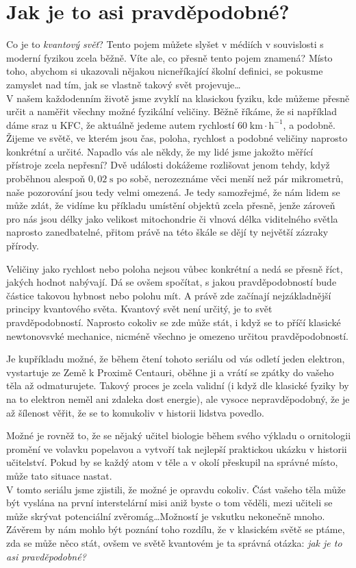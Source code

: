 \documentclass[crop=false]{standalone}
\begin{document}
\section*{Jak je to asi pravděpodobné?}
\quad

Co je to \textit{kvantový svět}? Tento pojem můžete slyšet v médiích v souvislosti s moderní fyzikou zcela běžně. Víte ale, co přesně tento pojem znamená? Místo toho, abychom si ukazovali nějakou nicneříkající školní definici, se pokusme zamyslet nad tím, jak se vlastně takový svět projevuje\dots
\\

V našem každodenním životě jsme zvyklí na klasickou fyziku, kde můžeme přesně určit a naměřit všechny možné fyzikální veličiny. Běžně říkáme, že si například dáme sraz u KFC, že aktuálně jedeme autem rychlostí $60\;\mathrm{km\cdot h^{-1}}$, a podobně. Žijeme ve světě, ve kterém jsou čas, poloha, rychlost a podobné veličiny naprosto konkrétní a určité. Napadlo vás ale někdy, že my lidé jsme jakožto měřící přístroje zcela nepřesní? Dvě události dokážeme rozlišovat jenom tehdy, když proběhnou alespoň $0,02\;\mathrm{s}$ po sobě, nerozeznáme věci menší než pár mikrometrů, naše pozorování jsou tedy velmi omezená. Je tedy samozřejmé, že nám lidem se může zdát, že vidíme ku příkladu umístění objektů zcela přesně, jenže zároveň pro nás jsou délky jako velikost mitochondrie či vlnová délka viditelného světla
naprosto zanedbatelné, přitom právě na této škále se dějí ty největší zázraky přírody. 

Veličiny jako rychlost nebo poloha nejsou vůbec konkrétní a nedá se přesně říct, jakých hodnot nabývají. Dá se ovšem spočítat, s jakou pravděpodobností bude částice takovou hybnost nebo polohu mít. A právě zde začínají nejzákladnější principy kvantového světa. Kvantový svět není určitý, je to svět pravděpodobností. Naprosto cokoliv se zde může stát, i když se to příčí klasické newtonovsvké mechanice, nicméně všechno je omezeno určitou pravděpodobností.

Je kupříkladu možné, že během čtení tohoto seriálu od vás odletí jeden elektron, vystartuje ze Země k Proximě Centauri, oběhne ji a vrátí se zpátky do vašeho těla až odmaturujete. Takový proces je zcela validní (i když dle klasické fyziky by na to elektron neměl ani zdaleka dost energie), ale vysoce nepravděpodobný, že je až šílenost věřit, že se to komukoliv v historii lidstva povedlo.

Možné je rovněž to, že se nějaký učitel biologie během svého výkladu o ornitologii promění ve volavku popelavou a vytvoří tak nejlepší praktickou ukázku v historii učitelství. Pokud by se každý atom v těle a v okolí přeskupil na správné místo, může tato situace nastat.
\\

V tomto seriálu jsme zjistili, že možné je opravdu cokoliv. Část vašeho těla může být vyslána na první interstelární misi aniž byste o tom věděli, mezi učiteli se může skrývat potenciální zvěromág\dots Možností je vskutku nekonečně mnoho. Závěrem by nám mohlo být poznání toho rozdílu, že v klasickém světě se ptáme, zda se může něco stát, ovšem ve světě kvantovém je ta správná otázka: \textit{jak je to asi pravděpodobné?}
\end{document}
